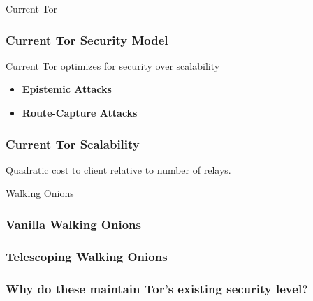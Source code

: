 \documentclass{beamer}
\begin{document}
\begin{frame}
  \centering
  \huge
  Current Tor
\end{frame}

\begin{frame}
\frametitle{Current Tor Security Model}

Current Tor optimizes for security over scalability

  \begin{itemize}
    \item \textbf{Epistemic Attacks}
    \item \textbf{Route-Capture Attacks}
  \end{itemize}

\end{frame}

\begin{frame}
\frametitle{Current Tor Scalability}

Quadratic cost to client relative to number of relays.

\end{frame}

\begin{frame}
  \centering
  \huge
  Walking Onions
\end{frame}

\begin{frame}
\frametitle{Vanilla Walking Onions}
\end{frame}

\begin{frame}
\frametitle{Telescoping Walking Onions}
\end{frame}

\begin{frame}
\frametitle{Why do these maintain Tor's existing security level?}
\end{frame}
\end{document}
